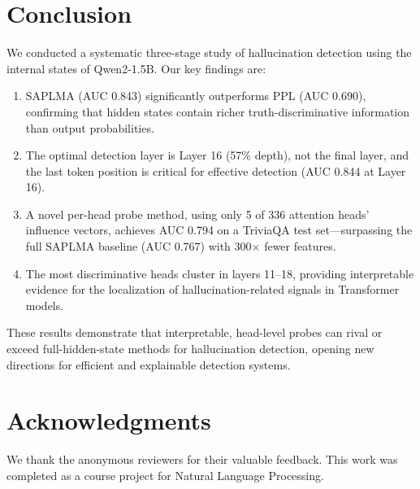 \documentclass[11pt]{article}
\begin{document}
\section{Conclusion}

We conducted a systematic three-stage study of hallucination detection using the internal states of Qwen2-1.5B. Our key findings are:

\begin{enumerate}
    \item SAPLMA (AUC 0.843) significantly outperforms PPL (AUC 0.690), confirming that hidden states contain richer truth-discriminative information than output probabilities.
    \item The optimal detection layer is Layer 16 (57\% depth), not the final layer, and the last token position is critical for effective detection (AUC 0.844 at Layer 16).
    \item A novel per-head probe method, using only 5 of 336 attention heads' influence vectors, achieves AUC 0.794 on a TriviaQA test set---surpassing the full SAPLMA baseline (AUC 0.767) with 300$\times$ fewer features.
    \item The most discriminative heads cluster in layers 11--18, providing interpretable evidence for the localization of hallucination-related signals in Transformer models.
\end{enumerate}

These results demonstrate that interpretable, head-level probes can rival or exceed full-hidden-state methods for hallucination detection, opening new directions for efficient and explainable detection systems.

\section*{Acknowledgments}

We thank the anonymous reviewers for their valuable feedback. This work was completed as a course project for Natural Language Processing.


\end{document}
